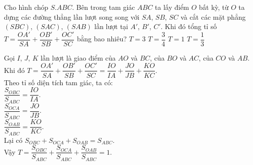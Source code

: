 \begin{ex}%
 Cho hình chóp $S.ABC$. Bên trong tam giác $ABC$ ta lấy điểm $O$ bất kỳ, từ $O$ ta dựng các đường thẳng lần lượt song song với $SA$, $SB$, $SC$ và cắt các mặt phẳng $(SBC)$, $(SAC)$, $(SAB)$ lần lượt tại $A'$, $B'$, $C'$. Khi đó tổng tỉ số $T = \dfrac{OA'}{SA} + \dfrac{OB'}{SB} + \dfrac{OC'}{SC}$ bằng bao nhiêu?
 \choice
  {$T = 3$}
  {$T = \dfrac{3}{4}$}
  {\True $T = 1$}
  {$T = \dfrac{1}{3}$}
 \loigiai
  {
  \immini
  {
  Gọi $I$, $J$, $K$ lần lượt là giao điểm của $AO$ và $BC$, của $BO$ và $AC$, của $CO$ và $AB$.\\
  Khi đó $T = \dfrac{OA'}{SA} + \dfrac{OB'}{SB} + \dfrac{OC'}{SC} = \dfrac{IO}{IA} + \dfrac{JO}{JB} + \dfrac{KO}{KC}$.\\
  Theo tỉ số diện tích tam giác, ta có:\\
  $\dfrac{S_{OBC}}{S_{ABC}} = \dfrac{IO}{IA}$.\\
  $\dfrac{S_{OCA}}{S_{ABC}} = \dfrac{JO}{JB}$.\\
  $\dfrac{S_{OAB}}{S_{ABC}} = \dfrac{KO}{KC}$.\\
  Lại có $S_{OBC} + S_{OCA} + S_{OAB} = S_{ABC}$.\\
  Vậy $T = \dfrac{S_{OBC}}{S_{ABC}} + \dfrac{S_{OCA}}{S_{ABC}} + \dfrac{S_{OAB}}{S_{ABC}} = 1$.
  }
  {
  }
  }
\end{ex}


